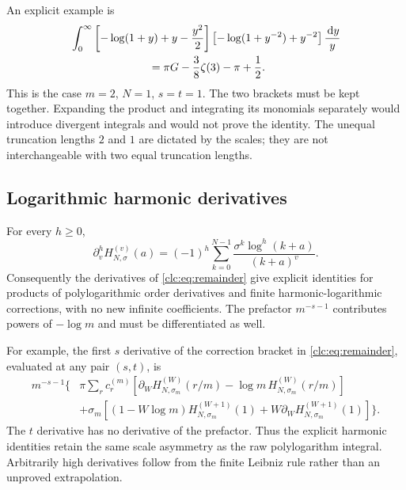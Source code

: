 An explicit example is
\begin{align}
 &\int_0^\infty
 \left[-\log(1+y)+y-\frac{y^2}{2}\right]
 \left[-\log(1+y^{-2})+y^{-2}\right]\frac{\dd y}{y}\notag\\
 &\hspace{25mm}=\pi G-\frac38\zeta(3)-\pi+\frac12.
 \label{clc:eq:Rexample}
\end{align}
This is the case $m=2$, $N=1$, $s=t=1$. The two brackets must be kept
together. Expanding the product and integrating its monomials separately
would introduce divergent integrals and would not prove the identity.
The unequal truncation lengths $2$ and $1$ are dictated by the scales;
they are not interchangeable with two equal truncation lengths.

\subsection{Logarithmic harmonic derivatives}
For every $h\ge0$,
\begin{equation}\label{clc:eq:Hjets}
 \partial_v^hH_{N,\sigma}^{(v)}(a)
 =(-1)^h\sum_{k=0}^{N-1}
       \frac{\sigma^k\log^h(k+a)}{(k+a)^v}.
\end{equation}
Consequently the derivatives of \eqref{clc:eq:remainder} give explicit
identities for products of polylogarithmic order derivatives and finite
harmonic-logarithmic corrections, with no new infinite coefficients.
The prefactor $m^{-s-1}$ contributes powers of $-\log m$ and must be
differentiated as well.

For example, the first $s$ derivative of the correction bracket in
\eqref{clc:eq:remainder}, evaluated at any pair $(s,t)$, is
\begin{align*}
 m^{-s-1}\biggl\{&\pi\sum_r c_r^{(m)}
       [\partial_W H_{N,\sigma_m}^{(W)}(r/m)
                     -\log m\,H_{N,\sigma_m}^{(W)}(r/m)]\\
 &+\sigma_m[(1-W\log m)H_{N,\sigma_m}^{(W+1)}(1)
                  +W\partial_W H_{N,\sigma_m}^{(W+1)}(1)]\biggr\}.
\end{align*}
The $t$ derivative has no derivative of the prefactor. Thus the explicit
harmonic identities retain the same scale asymmetry as the raw
polylogarithm integral. Arbitrarily high derivatives follow from the
finite Leibniz rule rather than an unproved extrapolation.
